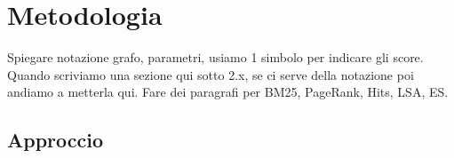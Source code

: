 \section{Metodologia}
\label{sec:metodologia}

Spiegare notazione grafo, parametri, usiamo 1 simbolo per indicare gli score. Quando scriviamo una sezione qui sotto 2.x, se ci serve della notazione poi andiamo a metterla qui. 
Fare dei paragrafi per BM25, PageRank, Hits, LSA, ES.


\subsection{Approccio}
\label{sec:approccio}



